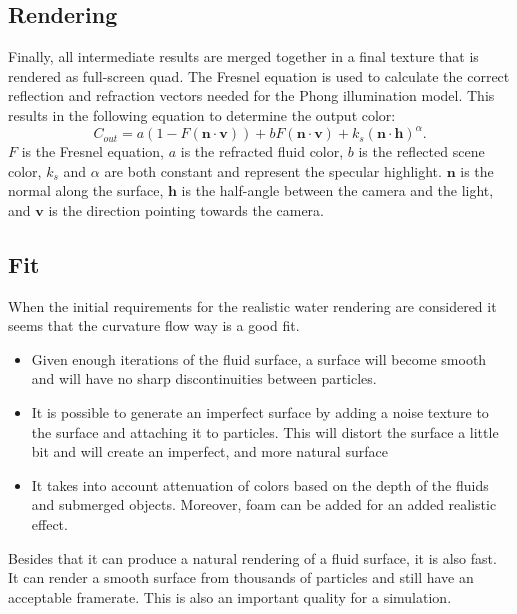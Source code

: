 \subsection{Rendering}
Finally, all intermediate results are merged together in a final texture that is rendered as full-screen quad.
The Fresnel equation is used to calculate the correct reflection and refraction vectors needed for the Phong \cite{phong1975illumination} illumination model.
This results in the following equation \cite{van2009screen}to determine the output color:
\begin{equation}
\label{eq:shading}
C_{out} = a(1 - F(\mathbf{n} \cdot \mathbf{v})) + bF(\mathbf{n} \cdot \mathbf{v}) + k_s(\mathbf{n} \cdot \mathbf{h})^\alpha.
\end{equation}
$F$ is the Fresnel equation, $a$ is the refracted fluid color, $b$ is the reflected scene color, $k_s$ and $\alpha$ are both constant and represent the specular highlight. $\mathbf{n}$ is the normal along the surface, $\mathbf{h}$ is the half-angle between the camera and the light, and $\mathbf{v}$ is the direction pointing towards the camera.


\subsection{Fit}
When the initial requirements for the realistic water rendering are considered it seems that the curvature flow way is a good fit.
\begin{itemize}
\item Given enough iterations of the fluid surface, a surface will become smooth and will have no sharp discontinuities between particles.
\item It is possible to generate an imperfect surface by adding a noise texture to the surface and attaching it to particles. This will distort the surface a little bit and will create an imperfect, and more natural surface
\item It takes into account attenuation of colors based on the depth of the fluids and submerged objects. Moreover, foam can be added for an added realistic effect.
\end{itemize}
Besides that it can produce a natural rendering of a fluid surface, it is also fast. 
It can render a smooth surface from thousands of particles and still have an acceptable framerate. 
This is also an important quality for a simulation.
